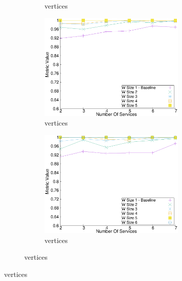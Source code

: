 \begin{figure}[H]
\begin{adjustbox}{minipage=\linewidth,scale=0.75}
\begin{subfigure}{0.45\textwidth}
\begin{subfigure}{\textwidth}
          \caption{ vertices}
          \label{fig:quality_window_wide_qualitative_n4}
        \end{subfigure}
        \begin{subfigure}{\textwidth}
          \includegraphics[width=\textwidth]{Images/graphs/window_quality_performance_diff_qual_n7_s7_20_100_n5}
          \caption{ vertices}
          \label{fig:quality_window_wide_qualitative_n5}
        \end{subfigure}

        \begin{subfigure}{\textwidth}
          \includegraphics[width=\textwidth]{Images/graphs/window_quality_performance_diff_qual_n7_s7_20_100_n6}
          \caption{ vertices}
          \label{fig:quality_window_wide_qualitative_n6}
        \end{subfigure}


\end{subfigure}
\end{adjustbox}
\end{figure}
